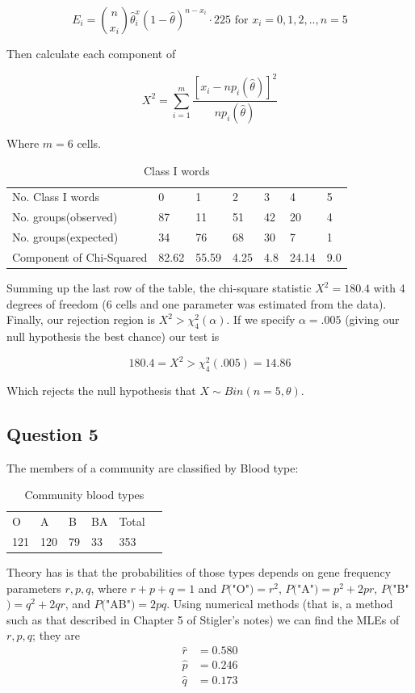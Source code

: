 \documentclass{tufte-book}
\theoremstyle{mytheoremstyle}
\theoremstyle{mylemstyle}
\theoremstyle{mydefstyle}
\begin{document}
\[ E_i = \binom{n}{x_i} \hat{\theta}^x_i (1-\hat{\theta})^{n-x_i} \cdot 225 \text{ for } x_i = 0,1,2,..,n=5 \]

Then calculate each component of

\[ X^2 = \sum_{i=1}^m \frac{[x_i - np_i(\hat{\theta})]^2}{np_i(\hat{\theta})}\]

Where $m=6$ cells.

\begin{table}
\centering
\begin{tabular}{l|llllll}
No. Class I words & 0 & 1 & 2 & 3 & 4 & 5 \\
No. groups(observed) & 87 & 11 & 51 & 42 & 20 & 4 \\
No. groups(expected) &34&76&68&30&7&1\\
Component of Chi-Squared &82.62&55.59&4.25&4.8&24.14&9.0
\end{tabular}
\caption{Class I words}
\label{millwords}
\end{table}

Summing up the last row of the table, the chi-square statistic $X^2=180.4$ with 4 degrees of freedom (6 cells and one parameter was estimated from the data).  Finally, our rejection region is $X^2 > \chi_4^2(\alpha)$.  If we specify $\alpha=.005$ (giving our null hypothesis the best chance) our test is

\[ 180.4 = X^2 > \chi_4^2(.005) = 14.86 \]

Which rejects the null hypothesis that $X \sim Bin(n=5, \theta)$.


\subsection{Question 5}
The members of a community are classified by Blood type:

\begin{table}
\centering
\begin{tabular}{llllll}
O&A&B&BA&Total\\
121&120&79&33&353
\end{tabular}
\caption{Community blood types}
\label{bloodtypes}
\end{table}

Theory has is that the probabilities of those types depends on gene frequency parameters $r,p,q$, where $r+p+q=1$ and $P($"O"$)=r^2$, $P($"A"$)=p^2+2pr$, $P($"B"$)=q^2+2qr$, and $P($"AB"$)=2pq$.  Using numerical methods (that is, a method such as that described in Chapter 5 of Stigler's notes) we can find the MLEs of $r,p,q$; they are
\begin{align*}
\hat{r} &= 0.580 \\
\hat{p} &= 0.246 \\
\hat{q} &= 0.173 \\
\end{align*}
\end{document}
